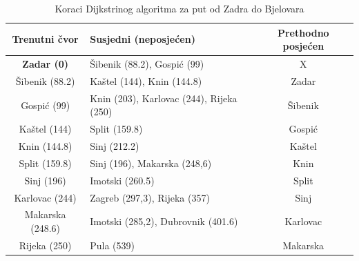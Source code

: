 \documentclass[10pt]{scrartcl}
\begin{document}
\begin{center}
\begin{table}[H]
\caption{Koraci Dijkstrinog algoritma za put od Zadra do Bjelovara}
\begin{tabularx}{1\textwidth}{c X c}
\hline
\textbf{Trenutni čvor}                           & \textbf{Susjedni (neposjećen)}                                                      & \textbf{Prethodno posjećen} \\ \hline
{\textbf{Zadar (0)}}        & Šibenik (88.2), Gospić (99)                                                         & X                           \\ \hline
Šibenik (88.2)                                   & Kaštel (144), Knin (144.8)                                                          & Zadar                       \\ \hline
Gospić (99)                                      & {\color[HTML]{9B9B9B} Knin (203)}, Karlovac (244), Rijeka (250)                     & Šibenik                     \\ \hline
Kaštel (144)                                     & Split (159.8)                                                                       & Gospić                      \\ \hline
Knin (144.8)                                     & {\color[HTML]{9B9B9B} Sinj (212.2)}                                                 & Kaštel                      \\ \hline
Split (159.8)                                    & Sinj (196), Makarska (248,6)                                                        & Knin                        \\ \hline
Sinj (196)                                       & Imotski (260.5)                                                                     & Split                       \\ \hline
Karlovac (244)                                   & Zagreb (297,3), Rijeka (357)                                                        & Sinj                        \\ \hline
Makarska (248.6)                                 & {\color[HTML]{9B9B9B} Imotski (285,2)}, Dubrovnik (401.6)                           & Karlovac                    \\ \hline
Rijeka (250)                                     & Pula (539)                                                                          & Makarska                    \\ \hline

\end{tabularx}
\end{table}
\end{center}
\end{document}
